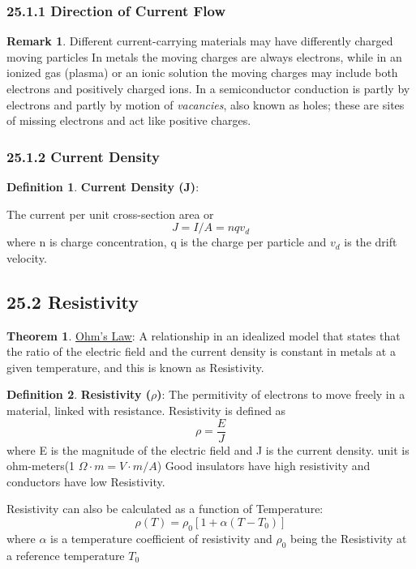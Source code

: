 \documentclass[12pt]{amsart}
\theoremstyle{definition}
\newtheorem{theorem}{Theorem}  %
\newtheorem{definition}{Definition} %
\newtheorem*{remark}{Remark}        %
\numberwithin{equation}{theorem}    %
\begin{document}
 \subsubsection*{25.1.1 Direction of Current Flow}

\begin{remark}
    Different current-carrying materials may have differently charged moving particles
    In metals the moving charges are always electrons, while in an ionized gas (plasma) or an ionic 
    solution the moving charges may include both electrons and positively charged ions.
    In a semiconductor conduction is partly by electrons and partly by motion 
    of \textit{vacancies}, also known as holes; these are sites of missing electrons 
    and act like positive charges.
\end{remark}

\subsubsection*{25.1.2 Current Density}

\begin{definition}
    \textbf{Current Density (J)}:

   The current per unit cross-section area or $$J = I/A = nqv_d$$ where n is charge concentration, 
   q is the charge per particle and $v_d$ is the drift velocity.
\end{definition}

\subsection*{25.2 Resistivity}

\begin{theorem}
    \underline{Ohm's Law}:
    A relationship in an idealized model that states that the ratio of the electric
    field and the current density is constant in metals at a given temperature, and this is known
    as Resistivity.
\end{theorem}

\begin{definition}
    \textbf{Resistivity ($\rho$)}:
    The permitivity of electrons to move freely in a material, linked with resistance.
    Resistivity is defined as $$ \rho = \frac{E}{J}$$ where E is the magnitude 
    of the electric field and J is the current density. unit is ohm-meters(1 $\Omega \cdot m =V \cdot m/A$)
    Good insulators have high resistivity and conductors have low Resistivity.

    Resistivity can also be calculated as a function of Temperature:
    $$\rho(T) = \rho_0[1+\alpha(T-T_0)]$$ where $\alpha$ is a temperature 
    coefficient of resistivity and  $\rho_0$ being the Resistivity at a reference temperature $T_0$
\end{definition}
\end{document}
